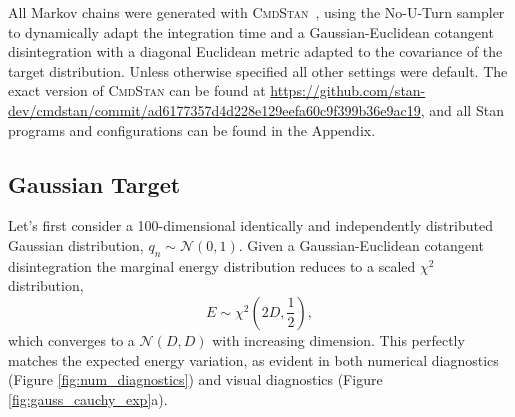 \documentclass[stslayout]{imsart}
\begin{document}
All Markov chains were generated with \textsc{CmdStan}~\citep{CmdStan:2016}, 
using the No-U-Turn sampler~\citep{HoffmanEtAl:2014} to dynamically 
adapt the integration time and a Gaussian-Euclidean cotangent disintegration 
with a diagonal Euclidean metric adapted to the covariance of the target 
distribution.  Unless otherwise specified all other settings were default.  
The exact version of \textsc{CmdStan} can be found at 
\url{https://github.com/stan-dev/cmdstan/commit/ad6177357d4d228e129eefa60c9f399b36e9ac19}, and all Stan programs 
and configurations can be found in the Appendix.

\subsection{Gaussian Target}

Let's first consider a 100-dimensional identically and independently distributed
Gaussian distribution, $q_{n} \sim \mathcal{N} \! \left( 0, 1 \right)$.  Given a
Gaussian-Euclidean cotangent disintegration the marginal energy distribution
reduces to a scaled $\chi^{2}$ distribution, 
%
\begin{equation*}
E \sim \chi^{2} \! \left( 2 D, \frac{1}{2} \right),
\end{equation*}
%
which converges to a $\mathcal{N} \! \left( D, D \right)$ with increasing
dimension.  This perfectly matches the expected energy variation, as evident
in both numerical diagnostics (Figure \ref{fig:num_diagnostics})  and visual
diagnostics (Figure \ref{fig:gauss_cauchy_exp}a).
\end{document}
